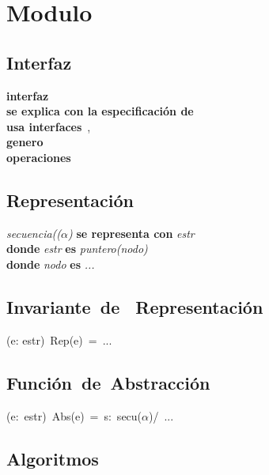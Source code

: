 \section*{Modulo }

\vspace{22pt}

\subsection*{Interfaz}
\textbf{interfaz}\ \\
\textbf{se explica con la especificaci\'on de}\ \\
\textbf{usa interfaces}\ , \\
\textbf{genero}\ \\
\textbf{operaciones}\\

\subsection*{Representaci\'on}
\textit{secuencia(($\alpha$)} \textbf{se representa con} \textit{estr}\\
\textbf{donde} \textit{estr} \textbf{es} \textit{puntero(nodo)}\\
\textbf{donde} \textit{nodo} \textbf{es} \textit{...}\\

\subsection*{Invariante\ de \ Representaci\'on}
\vspace{11pt}
(\forall e: estr)\ Rep(e)\ =\ ...
\vspace{33pt}

\subsection*{Funci\'on\ de\ Abstracci\'on}
\vspace{11pt}
(\forall e:\ estr)\ Abs(e)\ =\ s:\ secu($\alpha$)/\ ...
\vspace{33pt}

\subsection*{Algoritmos}